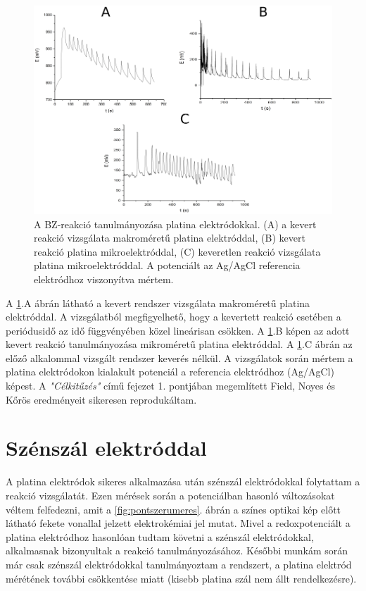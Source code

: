 \begin{figure}
\centering
\includegraphics[width=1\textwidth]{img/platina_meres.png}
\caption{A BZ-reakció tanulmányozása platina elektródokkal. (A) a kevert reakció vizsgálata makroméretű platina elektróddal, (B) kevert reakció platina mikroelektróddal, (C) keveretlen reakció vizsgálata platina mikroelektróddal. A potenciált az Ag/AgCl referencia elektródhoz viszonyítva mértem.}
\label{fig:platina_meres}
\end{figure}
A \ref{fig:platina_meres}.A ábrán látható a kevert rendszer vizsgálata makroméretű platina elektróddal. A vizsgálatból megfigyelhető, hogy a kevertett reakció esetében a periódusidő az idő függvényében közel lineárisan csökken. A \ref{fig:platina_meres}.B képen az adott kevert reakció tanulmányozása mikroméretű platina elektróddal. A \ref{fig:platina_meres}.C ábrán az előző alkalommal vizsgált rendszer keverés nélkül. A vizsgálatok során mértem a platina elektródokon kialakult potenciál a referencia elektródhoz (Ag/AgCl) képest. A \emph{"Célkitűzés"} című fejezet 1. pontjában megemlített Field, Noyes és Kőrös eredményeit \cite{noyes1972oscillations} sikeresen reprodukáltam.  

\section{Szénszál elektróddal}
A platina elektródok sikeres alkalmazása után szénszál elektródokkal folytattam a reakció vizsgálatát. Ezen mérések során a potenciálban hasonló változásokat véltem felfedezni, amit a \ref{fig:pontszerumeres}. ábrán a színes optikai kép előtt látható fekete vonallal jelzett elektrokémiai jel mutat. Mivel a redoxpotenciált a platina elektródhoz hasonlóan tudtam követni a szénszál elektródokkal, alkalmasnak bizonyultak a reakció tanulmányozásához. Későbbi munkám során már csak szénszál elektródokkal tanulmányoztam a rendszert, a platina elektród mérétének további csökkentése miatt (kisebb platina szál nem állt rendelkezésre).
